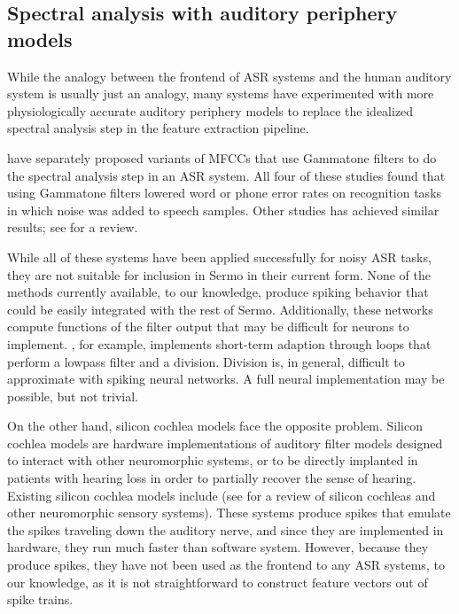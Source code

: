 \subsection{Spectral analysis with auditory periphery models}

While the analogy
between the frontend of ASR systems
and the human auditory system
is usually just an analogy,
many systems have experimented with
more physiologically accurate
auditory periphery models
to replace the idealized spectral analysis step
in the feature extraction pipeline.

\cite{tchorz1999,dimitriadis2005,schluter2007,shao2009}
have separately proposed variants of MFCCs
that use Gammatone filters
to do the spectral analysis step in an ASR system.
All four of these studies
found that using Gammatone filters
lowered word or phone error rates
on recognition tasks in which
noise was added to speech samples.
Other studies has achieved similar results;
see \cite{stern2012} for a review.

While all of these systems
have been applied successfully
for noisy ASR tasks,
they are not suitable
for inclusion in Sermo in their current form.
None of the methods currently available,
to our knowledge, produce spiking behavior
that could
be easily integrated with the rest of Sermo.
Additionally, these networks compute
functions of the filter output that
may be difficult for neurons to implement.
\cite{tchorz1999}, for example,
implements short-term adaption
through loops that perform
a lowpass filter and a division.
Division is, in general,
difficult to approximate with spiking neural networks.
A full neural implementation
may be possible,
but not trivial.

On the other hand,
silicon cochlea models face the opposite problem.
Silicon cochlea models are hardware implementations
of auditory filter models
designed to interact with other neuromorphic systems,
or to be directly implanted in
patients with hearing loss
in order to partially recover the sense of hearing.
Existing silicon cochlea models include
\cite{chan2007,hamilton2008,wen2009,karuppuswamy2013}
(see \cite{liu2010} for a review of
silicon cochleas
and other neuromorphic sensory systems).
These systems produce spikes
that emulate the spikes
traveling down the auditory nerve,
and since they are implemented in hardware,
they run much faster than software system.
However, because they produce spikes,
they have not been used
as the frontend to any ASR systems,
to our knowledge,
as it is not straightforward to
construct feature vectors
out of spike trains.

